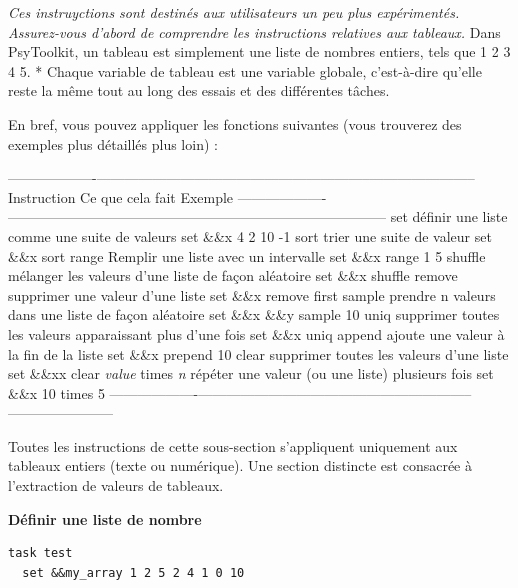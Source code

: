\documentclass[
]{book}
\begin{document}
\emph{Ces instruyctions sont destinés aux utilisateurs un peu plus expérimentés. Assurez-vous d'abord de comprendre les instructions relatives aux tableaux.
} Dans PsyToolkit, un tableau est simplement une liste de nombres entiers, tels que 1 2 3 4 5.
* Chaque variable de tableau est une variable globale, c'est-à-dire qu'elle reste la même tout au long des essais et des différentes tâches.

En bref, vous pouvez appliquer les fonctions suivantes (vous trouverez des exemples plus détaillés plus loin) :

\textbar-------------------\textbar-----------------------------------------------------------\textbar-----------------------\textbar{}
\textbar{} Instruction \textbar{} Ce que cela fait \textbar{} Exemple \textbar{}
\textbar-------------------\textbar-----------------------------------------------------------\textbar-----------------------\textbar{}
\textbar{} set \textbar{} définir une liste comme une suite de valeurs \textbar{} set \&\&x 4 2 10 -1 \textbar{}
\textbar{} sort \textbar{} trier une suite de valeur \textbar{} set \&\&x sort \textbar{}
\textbar{} range \textbar{} Remplir une liste avec un intervalle \textbar{} set \&\&x range 1 5 \textbar{}
\textbar{} shuffle \textbar{} mélanger les valeurs d'une liste de façon aléatoire \textbar{} set \&\&x shuffle \textbar{}
\textbar{} remove \textbar{} supprimer une valeur d'une liste \textbar{} set \&\&x remove first \textbar{}
\textbar{} sample \textbar{} prendre n valeurs dans une liste de façon aléatoire \textbar{} set \&\&x \&\&y sample 10 \textbar{}
\textbar{} uniq \textbar{} supprimer toutes les valeurs apparaissant plus d'une fois \textbar{} set \&\&x uniq \textbar{}
\textbar{} append \textbar{} ajoute une valeur à la fin de la liste \textbar{} set \&\&x prepend 10 \textbar{}
\textbar{} clear \textbar{} supprimer toutes les valeurs d'une liste \textbar{} set \&\&xx clear \textbar{}
\textbar{} \emph{value} times \emph{n} \textbar{} répéter une valeur (ou une liste) plusieurs fois \textbar{} set \&\&x 10 times 5 \textbar{}
\textbar-------------------\textbar-----------------------------------------------------------\textbar-----------------------\textbar{}

Toutes les instructions de cette sous-section s'appliquent uniquement aux tableaux entiers (texte ou numérique). Une section distincte est consacrée à l'extraction de valeurs de tableaux.

\textbf{Définir une liste de nombre}

\begin{verbatim}
task test
  set &&my_array 1 2 5 2 4 1 0 10
\end{verbatim}
\end{document}
